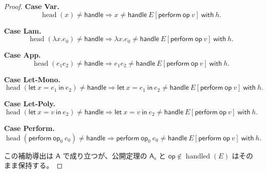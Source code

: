 \documentclass[a4paper,11pt]{article}
\theoremstyle{definition}
\newenvironment{Case}[1]{\par\smallskip\noindent\textbf{Case #1.}\enspace\ignorespaces}{\par}
\newcommand{\op}{\mathsf{op}}
\newcommand{\lete}[3]{\mathsf{let}\ #1=#2\ \mathsf{in}\ #3}
\newcommand{\perform}[2]{\mathsf{perform}\ #1\ #2}
\newcommand{\handle}[2]{\mathsf{handle}\ #1\ \mathsf{with}\ #2}
\newcommand{\A}{\mathsf A}
\newcommand{\AS}{\mathsf A_{\mathrm s}}
\newcommand{\proofspace}{\Needspace{16\baselineskip}}
\begin{document}
\begin{proof}
\begin{Case}{Var}
\[\operatorname{head}(x)\ne\mathsf{handle}\Longrightarrow x\ne\handle{E[\perform\op v]}h.\]
\end{Case}

\begin{Case}{Lam}
\[\operatorname{head}(\lambda x.e_0)\ne\mathsf{handle}\Longrightarrow \lambda x.e_0\ne\handle{E[\perform\op v]}h.\]
\end{Case}

\begin{Case}{App}
\[\operatorname{head}(e_1e_2)\ne\mathsf{handle}\Longrightarrow e_1e_2\ne\handle{E[\perform\op v]}h.\]
\end{Case}

\begin{Case}{Let-Mono}
\[\operatorname{head}(\lete x{e_1}{e_2})\ne\mathsf{handle}\Longrightarrow \lete x{e_1}{e_2}\ne\handle{E[\perform\op v]}h.\]
\end{Case}

\begin{Case}{Let-Poly}
\[\operatorname{head}(\lete x v{e_2})\ne\mathsf{handle}\Longrightarrow \lete x v{e_2}\ne\handle{E[\perform\op v]}h.\]
\end{Case}

\begin{Case}{Perform}
\[\operatorname{head}(\perform{\op_0}{e_0})\ne\mathsf{handle}\Longrightarrow \perform{\op_0}{e_0}\ne\handle{E[\perform\op v]}h.\]
\end{Case}
この補助導出は $\A$ で成り立つが、公開定理の $\AS$ と
$\op\notin\operatorname{handled}(E)$ はそのまま保持する。
\end{proof}

\proofspace
\end{document}
